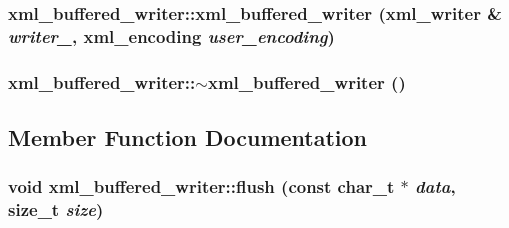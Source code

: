 \hypertarget{classxml__buffered__writer_3c22ad246e2aebb6597935baf4a223a7}{
\subsubsection[xml\_\-buffered\_\-writer]{\setlength{\rightskip}{0pt plus 5cm}xml\_\-buffered\_\-writer::xml\_\-buffered\_\-writer (xml\_\-writer \& {\em writer\_\-}, xml\_\-encoding {\em user\_\-encoding})}}
\label{classxml__buffered__writer_3c22ad246e2aebb6597935baf4a223a7}


\hypertarget{classxml__buffered__writer_a0aaa7ca5b9b61fb0e9dd79502e8d728}{
\subsubsection[$\sim$xml\_\-buffered\_\-writer]{\setlength{\rightskip}{0pt plus 5cm}xml\_\-buffered\_\-writer::$\sim$xml\_\-buffered\_\-writer ()}}
\label{classxml__buffered__writer_a0aaa7ca5b9b61fb0e9dd79502e8d728}




\subsection{Member Function Documentation}
\hypertarget{classxml__buffered__writer_a733cb2cd0d5fcacec92c67a7f26c553}{
\subsubsection[flush]{\setlength{\rightskip}{0pt plus 5cm}void xml\_\-buffered\_\-writer::flush (const char\_\-t $\ast$ {\em data}, size\_\-t {\em size})}}
\label{classxml__buffered__writer_a733cb2cd0d5fcacec92c67a7f26c553}


